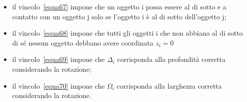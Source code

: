 \begin{itemize}
	\item il vincolo~\eqref{equa67} impone che un oggetto i possa essere al di sotto e a contatto con un oggetto j solo se l'oggetto i è al di sotto dell'oggetto j;
	\item il vincolo~\eqref{equa68} impone che tutti gli oggetti i che non abbiano al di sotto di sé nessun oggetto debbano avere coordinata $z_i=0$
	\item il vincolo~\eqref{equa69} impone che $\Delta_i$ corrisponda alla profondità corretta considerando la rotazione;
	\item il vincolo~\eqref{equa70} impone che $\Omega_i$ corrisponda alla larghezza corretta considerando la rotazione.
\end{itemize}

